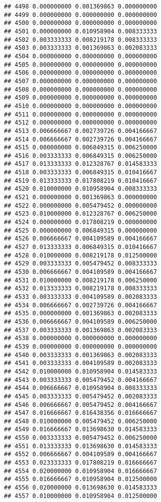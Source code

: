 \documentclass[
]{article}
\begin{document}
\begin{verbatim}
## 4498 0.000000000 0.001369863 0.000000000
## 4499 0.000000000 0.000000000 0.000000000
## 4500 0.000000000 0.000000000 0.000000000
## 4501 0.000000000 0.010958904 0.008333333
## 4502 0.003333333 0.008219178 0.008333333
## 4503 0.003333333 0.001369863 0.002083333
## 4504 0.000000000 0.000000000 0.000000000
## 4505 0.000000000 0.000000000 0.000000000
## 4506 0.000000000 0.000000000 0.000000000
## 4507 0.000000000 0.000000000 0.000000000
## 4508 0.000000000 0.000000000 0.000000000
## 4509 0.000000000 0.000000000 0.000000000
## 4510 0.000000000 0.000000000 0.000000000
## 4511 0.000000000 0.000000000 0.000000000
## 4512 0.000000000 0.000000000 0.000000000
## 4513 0.006666667 0.002739726 0.004166667
## 4514 0.006666667 0.002739726 0.004166667
## 4515 0.000000000 0.006849315 0.006250000
## 4516 0.003333333 0.006849315 0.006250000
## 4517 0.013333333 0.012328767 0.014583333
## 4518 0.003333333 0.006849315 0.010416667
## 4519 0.013333333 0.017808219 0.010416667
## 4520 0.010000000 0.010958904 0.008333333
## 4521 0.000000000 0.001369863 0.000000000
## 4522 0.000000000 0.005479452 0.000000000
## 4523 0.010000000 0.012328767 0.006250000
## 4524 0.000000000 0.017808219 0.000000000
## 4525 0.000000000 0.006849315 0.000000000
## 4526 0.006666667 0.004109589 0.004166667
## 4527 0.013333333 0.006849315 0.010416667
## 4528 0.010000000 0.008219178 0.012500000
## 4529 0.003333333 0.005479452 0.008333333
## 4530 0.006666667 0.004109589 0.004166667
## 4531 0.010000000 0.008219178 0.006250000
## 4532 0.013333333 0.008219178 0.008333333
## 4533 0.003333333 0.004109589 0.002083333
## 4534 0.006666667 0.002739726 0.004166667
## 4535 0.000000000 0.001369863 0.002083333
## 4536 0.006666667 0.004109589 0.006250000
## 4537 0.003333333 0.001369863 0.002083333
## 4538 0.000000000 0.000000000 0.000000000
## 4539 0.000000000 0.000000000 0.000000000
## 4540 0.003333333 0.001369863 0.002083333
## 4541 0.003333333 0.004109589 0.002083333
## 4542 0.010000000 0.010958904 0.014583333
## 4543 0.003333333 0.005479452 0.004166667
## 4544 0.006666667 0.010958904 0.008333333
## 4545 0.003333333 0.005479452 0.002083333
## 4546 0.006666667 0.005479452 0.004166667
## 4547 0.016666667 0.016438356 0.016666667
## 4548 0.010000000 0.005479452 0.006250000
## 4549 0.016666667 0.013698630 0.014583333
## 4550 0.003333333 0.005479452 0.006250000
## 4551 0.013333333 0.013698630 0.014583333
## 4552 0.006666667 0.004109589 0.004166667
## 4553 0.023333333 0.017808219 0.016666667
## 4554 0.020000000 0.010958904 0.016666667
## 4555 0.016666667 0.010958904 0.012500000
## 4556 0.020000000 0.013698630 0.014583333
## 4557 0.010000000 0.010958904 0.012500000

\end{verbatim}
\end{document}
